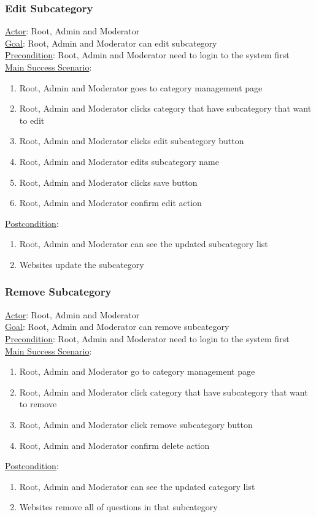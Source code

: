 \documentclass[12pt,oneside,openright,a4paper]{cpe-english-project}
\begin{document}
	\subsubsection{Edit Subcategory}
	\underline{Actor}: Root, Admin and Moderator\\
	\underline{Goal}: Root, Admin and Moderator can edit subcategory\\
	\underline{Precondition}: Root, Admin and Moderator need to login to the system first\\
	\underline{Main Success Scenario}:
	\begin{enumerate}[label={\arabic*.}]
		\item Root, Admin and Moderator goes to category management page
		\item Root, Admin and Moderator clicks category that have subcategory that want to edit
		\item Root, Admin and Moderator clicks edit subcategory button
		\item Root, Admin and Moderator edits subcategory name
		\item Root, Admin and Moderator clicks save button
		\item Root, Admin and Moderator confirm edit action
	\end{enumerate}
	\underline{Postcondition}: 
	\begin{enumerate}[label={\arabic*.}]
		\item Root, Admin and Moderator can see the updated subcategory list
		\item Websites update the subcategory
	\end{enumerate}

	\subsubsection{Remove Subcategory}
	\underline{Actor}: Root, Admin and Moderator\\
	\underline{Goal}: Root, Admin and Moderator can remove subcategory\\
	\underline{Precondition}: Root, Admin and Moderator need to login to the system first\\
	\underline{Main Success Scenario}:
	\begin{enumerate}[label={\arabic*.}]
		\item Root, Admin and Moderator go to category management page
		\item Root, Admin and Moderator click category that have subcategory that want to remove
		\item Root, Admin and Moderator click remove subcategory button
		\item Root, Admin and Moderator confirm delete action
	\end{enumerate}
	\underline{Postcondition}: 
	\begin{enumerate}[label={\arabic*.}]
		\item Root, Admin and Moderator can see the updated category list
		\item Websites remove all of questions in that subcategory
	\end{enumerate}
\end{document}
